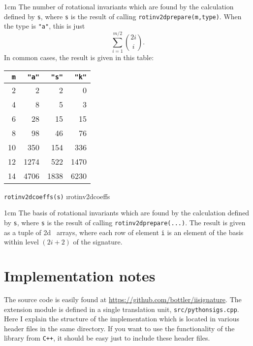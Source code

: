 \documentclass[a4paper]{extarticle}
\newenvironment{defn}{\begin{adjustwidth}{1cm}{}\ignorespaces}{\end{adjustwidth}\ignorespacesafterend}
\begin{document}
\begin{defn}
	\nopagebreak The number of rotational invariants which are found by the calculation defined by \verb!s!, where \verb!s! is the result of calling \verb!rotinv2dprepare(m,type)!. When the type is \verb|"a"|, this is just \[\sum_{i=1}^{m/2}\binom{2i}{i}.\] 
	In common cases, the result is given in this table:
\end{defn}


\begin{center}
\begin{tabular}{r|rrr}
\verb|m|&\verb|"a"|&\verb|"s"|&\verb|"k"|\\\hline
2&2&2&0\\
4&8&5&3\\
6&28&15&15\\
8&98&46&76\\
10&350&154&336\\
12&1274&522&1470\\
14&4706&1838&6230\\%
\end{tabular}
\end{center}

\verb!rotinv2dcoeffs(s)! \i{rotinv2dcoeffs}
\begin{defn}
	\nopagebreak The basis of rotational invariants which are found by the calculation defined by \verb!s!, where \verb!s! is the result of calling \verb!rotinv2dprepare(...)!. The result is given as a tuple of 2d \numpy\ arrays, where each row of element \verb|i| is an element of the basis within level $(2i+2)$ of the signature.
	\end{defn}

\section{Implementation notes}
The source code is easily found at \url{https://github.com/bottler/iisignature}. The extension module is defined in a single translation unit, \verb|src/pythonsigs.cpp|. Here I explain the structure of the implementation which is located in various header files in the same directory. If you want to use the functionality of the library from \verb!C++!, it should be easy just to include these header files.
\end{document}

